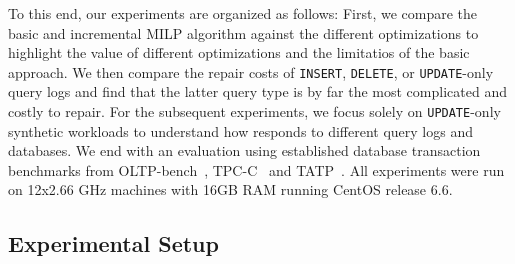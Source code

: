 To this end, our experiments are organized as follows: First, 
we compare the basic and incremental MILP algorithm against the different optimizations 
to highlight the value of different optimizations and the limitatios of the basic approach.  
We then compare the repair costs of \texttt{INSERT}, \texttt{DELETE}, or \texttt{UPDATE}-only query logs 
and find that the latter query type is by far the most complicated and costly to repair.
For the subsequent experiments, we focus solely on \texttt{UPDATE}-only synthetic workloads 
to understand how \sys responds to different query logs and databases.  
We end with an evaluation using established database transaction benchmarks from OLTP-bench~\cite{difallah2013oltp},
TPC-C~\cite{tpcc} and TATP~\cite{tatp}. 
All experiments were run on 12x2.66 GHz  machines with 16GB RAM running CentOS release 6.6.







%
%

\subsection{Experimental Setup}


